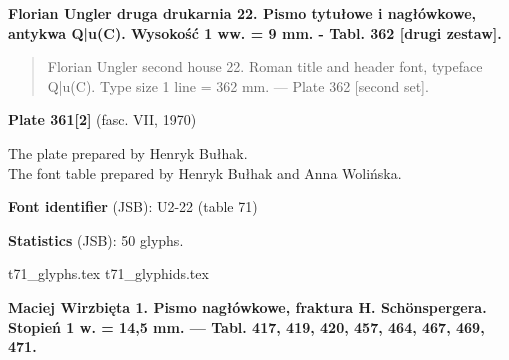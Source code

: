 \documentclass[12pt]{article}
\newcommand{\bg}{\begingl}
\newcommand{\pismoPL}[1]{{\relsize{2}\Junicode\textbf{#1}}}
\newcommand{\pismoEN}[1]{{\relsize{1}\Junicode\begin{quote}#1\end{quote}}}
\newcommand{\plate}[3]{\textbf{Plate #1} (fasc. #2, #3)}
\newcommand{\exampleBib}[1]{{\relsize{2}\Junicode\textbf{The
      example:}\\[2ex] CATALOGUS LIBRORUM \textbf{#1}}}
\newcommand{\exampleDesc}[1]{{\relsize{0}\Junicode#1}}
\newcommand{\exampleDig}[1]{{\relsize{0}\Junicode \textbf{Digitization(s) [JSB]:} #1}}
\newcommand{\exampleLib}[1]{{\relsize{0}\Junicode \textbf{Library:} #1}}
\newcommand{\fontID}[2]{{\relsize{1}\Junicode\textbf{Font identifier} (JSB): #1 (table #2)}}
\newcommand{\fontstat}[1]{{\relsize{1}\Junicode\textbf{Statistics} (JSB): #1 glyphs.}}
\newcommand{\exampleRef}[1]{{\relsize{0}\Junicode \textbf{References:} #1}}
\newcommand{\examplePage}[1]{{Page reference: \relsize{0}\Junicode#1}}
\begin{document}
 \pismoPL{Florian Ungler druga drukarnia 22. Pismo tytułowe i nagłówkowe, antykwa Q|u(C). Wysokość 1 ww. = 9 mm. - Tabl. 362 [drugi zestaw].}
  
 \pismoEN{Florian Ungler second house 22. Roman title and header font, typeface
   Q|u(C). Type size 1 line = 362 mm. — Plate 362 [second set].}

\plate{361[2]}{VII}{1970}

The plate prepared by Henryk Bułhak.\\
The font table prepared by Henryk Bułhak and Anna Wolińska.

\bigskip







 

\bigskip

\fontID{U2-22}{71}

\fontstat{50}

  {t71_glyphs.tex}
  {t71_glyphids.tex}

 
 \newpage
 
% 

 


 \pismoPL{Maciej Wirzbięta 1. Pismo nagłówkowe, fraktura H. Schönspergera. Stopień 1 w. = 14,5 mm. — Tabl. 417, 419, 420, 457, 464, 467, 469, 471.}
  
\end{document}
